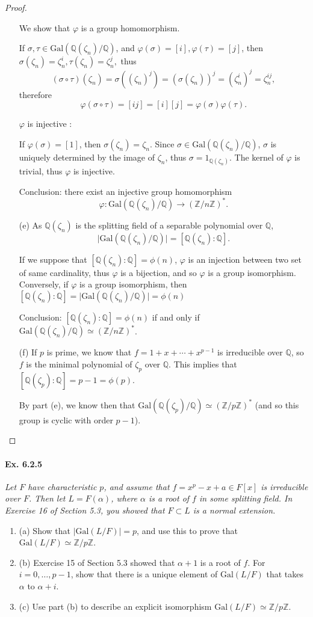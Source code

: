 \documentclass[11pt,a4paper]{article}
\newcommand{\be} {\begin{enumerate}}
\newcommand{\ee} {\end{enumerate}}
\newcommand{\Q}{\mathbb{Q}}
\newcommand{\Z}{\mathbb{Z}}
\newcommand{\Gal}{\mathrm{Gal}}
\begin{document}
\begin{proof}
\begin{enumerate}
We show that $\varphi$ is a group homomorphism. 

If $\sigma,\tau \in  \Gal(\Q(\zeta_n)/\Q)$, and $\varphi(\sigma) = [i], \varphi(\tau) = [j]$, then $\sigma(\zeta_n) = \zeta_n^i, \tau(\zeta_n) = \zeta_n^j,$ thus
$$(\sigma \circ \tau)(\zeta_n) = \sigma((\zeta_n)^j)= (\sigma(\zeta_n))^j = (\zeta_n^i)^j = \zeta_n^{ij},$$therefore$$\varphi(\sigma \circ \tau) = [ij] = [i][j] = \varphi(\sigma)\varphi(\tau).$$

$\varphi$ is injective :

If $\varphi(\sigma) = [1]$, then $\sigma(\zeta_n) = \zeta_n$. Since $\sigma \in \Gal(\Q(\zeta_n)/\Q)$, $\sigma$ is uniquely determined by the image of $\zeta_n$, thus $\sigma = 1_{\Q(\zeta_n)}$. The kernel of $\varphi$ is trivial, thus $\varphi$ is injective.

Conclusion: there exist an injective group homomorphism 
$$\varphi : \Gal(\Q(\zeta_n)/\Q)   \to   ( \Z/n\Z)^*.$$


\item[(e)]
As $\Q(\zeta_n)$ is the splitting field of a separable polynomial over  $\Q$, $$\vert  \Gal(\Q(\zeta_n)/\Q)\vert = [\Q(\zeta_n):\Q].$$

If we suppose that $ [\Q(\zeta_n):\Q]= \phi(n)$,  $\varphi$ is an injection between two set of same cardinality, thus $\varphi$ is a bijection, and so $\varphi$ is a group isomorphism. Conversely, if $\varphi$ is a group isomorphism, then $ [\Q(\zeta_n):\Q] = \vert \Gal(\Q(\zeta_n)/\Q)\vert = \phi(n)$

Conclusion: $ [\Q(\zeta_n):\Q] = \phi(n)$ if and only if $ \Gal(\Q(\zeta_n)/\Q)   \simeq   ( \Z/n\Z)^*$.


\item[(f)]
If $p$ is prime, we know  that $f = 1+x+\cdots+x^{p-1}$ is irreducible over $\Q$, so $f$ is the minimal polynomial of $\zeta_p$ over $\Q$. This implies that $[\Q(\zeta_p) : \Q] = p-1 = \phi(p)$.

By part (e), we know then that $ \Gal(\Q(\zeta_p)/\Q)   \simeq   ( \Z/p\Z)^*$ (and so this group is cyclic with order $p-1$).
\end{enumerate}
\end{proof}


\paragraph{Ex. 6.2.5}
{\it Let $F$ have characteristic $p$, and assume that $f = x^p -x +a \in F[x]$ is irreducible over $F$. Then let $L = F(\alpha)$, where $\alpha$ is a root of $f$ in some splitting field. In Exercise 16 of Section 5.3, you showed that $F\subset L$ is a normal extension.
\be
\item[(a)] Show that $|\Gal(L/F) | = p$, and use this to prove that $\Gal(L/F)\simeq \Z/p\Z$.
\item[(b)] Exercise 15 of Section 5.3 showed that $\alpha +1$ is a root of $f$. For $i=0,\ldots,p-1$, show that there is a unique element of $\Gal(L/F)$ that takes $\alpha$ to $\alpha + i$.
\item[(c)] Use part (b) to describe an explicit isomorphism $\Gal(L/F) \simeq \Z/p\Z$.
\ee

}
\end{document}
